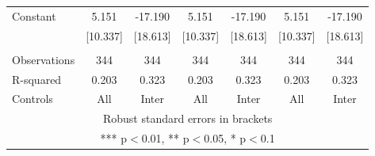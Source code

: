 \begin{tabular}{lcccccc}
Constant & 5.151 & -17.190 & 5.151 & -17.190 & 5.151 & -17.190 \\
 & [10.337] & [18.613] & [10.337] & [18.613] & [10.337] & [18.613] \\
 &  &  &  &  &  &  \\
Observations & 344 & 344 & 344 & 344 & 344 & 344 \\
R-squared & 0.203 & 0.323 & 0.203 & 0.323 & 0.203 & 0.323 \\
 Controls & All & Inter & All & Inter & All & Inter \\ \hline
\multicolumn{7}{c}{ Robust standard errors in brackets} \\
\multicolumn{7}{c}{ *** p$<$0.01, ** p$<$0.05, * p$<$0.1} \\
\end{tabular}
